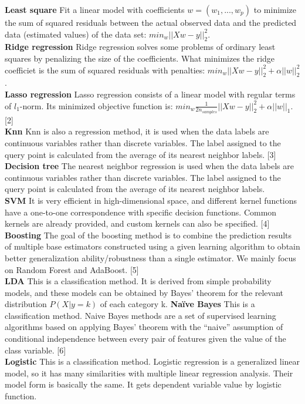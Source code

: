 \documentclass{article}
\begin{document}
\textbf{Least square} Fit a linear model with coefficients $w = (w_1, ..., w_p)$ to minimize the sum of squared residuals between the actual observed data and the predicted data (estimated values) of the data set: $min_w ||Xw-y||_2^2$.\\
\textbf{Ridge regression} Ridge regression solves some problems of ordinary least squares by penalizing the size of the coefficients. What minimizes the ridge coefficiet is the sum of squared residuals with penalties: $min_w ||Xw-y||_2^2+\alpha ||w||_2^2$.\\
\textbf{Lasso regression} Lasso regression consists of a linear model with regular terms of $l_1$-norm. Its minimized objective function is: $min_w \frac{1}{2n_{samples}} ||Xw-y||_2^2+\alpha ||w||_1$. [2]\\
\textbf{Knn} Knn is also a regression method, it is used when the data labels are continuous variables rather than discrete variables. The label assigned to the query point is calculated from the average of its nearest neighbor labels. [3]\\
\textbf{Decision tree} The nearest neighbor regression is used when the data labels are continuous variables rather than discrete variables. The label assigned to the query point is calculated from the average of its nearest neighbor labels.\\
\textbf{SVM} It is very efficient in high-dimensional space, and different kernel functions have a one-to-one correspondence with specific decision functions. Common kernels are already provided, and custom kernels can also be specified. [4]\\
\textbf{Boosting} The goal of the boosting method is to combine the prediction results of multiple base estimators constructed using a given learning algorithm to obtain better generalization ability/robustness than a single estimator. We mainly focus on Random Forest and AdaBoost. [5]\\
\textbf{LDA} This is a classification method. It is derived from simple probability models, and these models can be obtained by Bayes' theorem for the relevant distribution $P(X|y=k)$ of each category k.
\textbf{Naïve Bayes} This is a classification method. Naive Bayes methods are a set of supervised learning algorithms based on applying Bayes’ theorem with the “naive” assumption of conditional independence between every pair of features given the value of the class variable. [6]\\
\textbf{Logistic} This is a classification method. Logistic regression is a generalized linear model, so it has many similarities with multiple linear regression analysis. Their model form is basically the same. It gets dependent variable value by logistic function.
\end{document}
